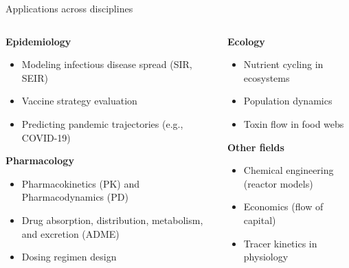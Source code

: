 \documentclass[aspectratio=169]{beamer}\usepackage[]{graphicx}\usepackage[]{xcolor}
\begin{document}
\begin{frame}{Applications across disciplines}
    \begin{columns}
        \begin{column}{0.5\textwidth}
            \textbf{Epidemiology}
            \begin{itemize}
                \item Modeling infectious disease spread (SIR, SEIR)
                \item Vaccine strategy evaluation
                \item Predicting pandemic trajectories (e.g., COVID-19)
            \end{itemize}
            \vspace{1cm}
            \textbf{Pharmacology}
            \begin{itemize}
                \item Pharmacokinetics (PK) and Pharmacodynamics (PD)
                \item Drug absorption, distribution, metabolism, and excretion (ADME)
                \item Dosing regimen design
            \end{itemize}
        \end{column}
        \begin{column}{0.5\textwidth}
            \textbf{Ecology}
            \begin{itemize}
                \item Nutrient cycling in ecosystems
                \item Population dynamics
                \item Toxin flow in food webs
            \end{itemize}
            \vspace{1cm}
            \textbf{Other fields}
            \begin{itemize}
                \item Chemical engineering (reactor models)
                \item Economics (flow of capital)
                \item Tracer kinetics in physiology
            \end{itemize}
        \end{column}
    \end{columns}
\end{frame}

\end{document}
